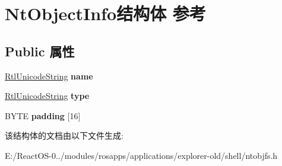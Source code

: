 \hypertarget{struct_nt_object_info}{}\section{Nt\+Object\+Info结构体 参考}
\label{struct_nt_object_info}
\subsection*{Public 属性}
\begin{DoxyCompactItemize}
\item 
\mbox{\label{struct_nt_object_info_a6e4356ae63589a250febc349bd99f564}} 
\hyperlink{struct_rtl_unicode_string}{Rtl\+Unicode\+String} {\bfseries name}
\item 
\mbox{\label{struct_nt_object_info_ae532ebcb54baa9d6e94573a9c7d034ec}} 
\hyperlink{struct_rtl_unicode_string}{Rtl\+Unicode\+String} {\bfseries type}
\item 
\mbox{\label{struct_nt_object_info_aeac2bf2f9a873138116e619473cb3a42}} 
B\+Y\+TE {\bfseries padding} \mbox{[}16\mbox{]}
\end{DoxyCompactItemize}


该结构体的文档由以下文件生成\+:\begin{DoxyCompactItemize}
\item 
E\+:/\+React\+O\+S-\/0../modules/rosapps/applications/explorer-\/old/shell/ntobjfs.\+h\end{DoxyCompactItemize}
